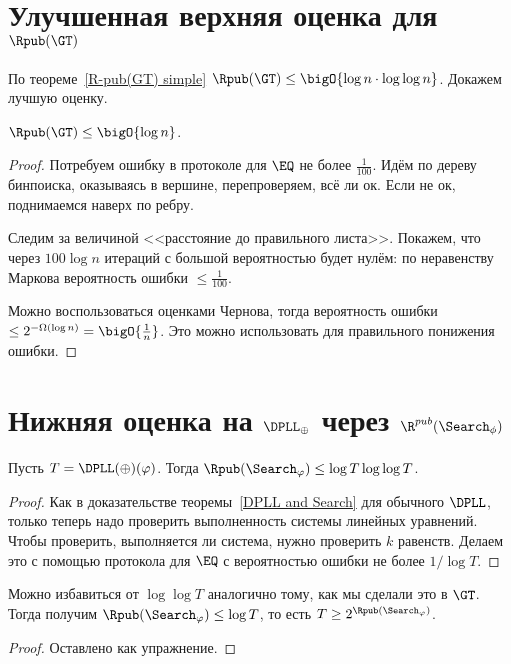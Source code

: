 \section{Улучшенная верхняя оценка для \texorpdfstring{$\Rpub(\GT)$}{R[pub](GT)}}

По теореме~\ref{R-pub(GT) simple} $\Rpub(\GT) \le \bigO{\log n \cdot \log\log n}$. Докажем лучшую оценку.

\begin{theorem}
    $\Rpub(\GT) \le \bigO{\log n}$.
\end{theorem}

\begin{proof}
    Потребуем ошибку в протоколе для $\EQ$ не более $\frac{1}{100}$. Идём по дереву бинпоиска, оказываясь
    в вершине, перепроверяем, всё ли ок. Если не ок, поднимаемся наверх по ребру.

    Следим за величиной <<расстояние до правильного листа>>. Покажем, что через $100\log n$ итераций с
    большой вероятностью будет нулём: по неравенству Маркова вероятность ошибки $\le \frac{1}{100}$.

    Можно воспользоваться оценками Чернова, тогда вероятность ошибки $\le 2^{-\Omega(\log n)} =
    \bigO{\frac{1}{n}}$. Это можно использовать для правильного понижения
    ошибки.
\end{proof}

\section{Нижняя оценка на \texorpdfstring{$\DPLL_\oplus$}{DPLL(⊕)} через \texorpdfstring{$\R^{pub}(\Search_\phi)$}{R[pub](Search(φ))}}

\begin{theorem}
    \label{DPLL-oplus and Search}
    Пусть $T = \DPLL(\oplus)(\varphi)$. Тогда $\Rpub(\Search_{\varphi}) \le \log T\log\log T$.
\end{theorem}

\begin{proof}
    Как в доказательстве теоремы~\ref{DPLL and Search} для обычного $\DPLL$, только теперь надо проверить
    выполненность системы линейных уравнений. Чтобы проверить, выполняется ли система, нужно проверить
    $k$ равенств. Делаем это с помощью протокола для $\EQ$ с вероятностью ошибки не более $1/\log T$.
\end{proof}

\begin{remark}
    Можно избавиться от $\log\log T$ аналогично тому, как мы сделали это в $\GT$.
    Тогда получим $\Rpub(\Search_{\varphi}) \le \log T$, то есть $T \ge 2^{\Rpub(\Search_{\varphi})}$.
\end{remark}

\begin{proof}
    Оставлено как упражнение.
\end{proof}